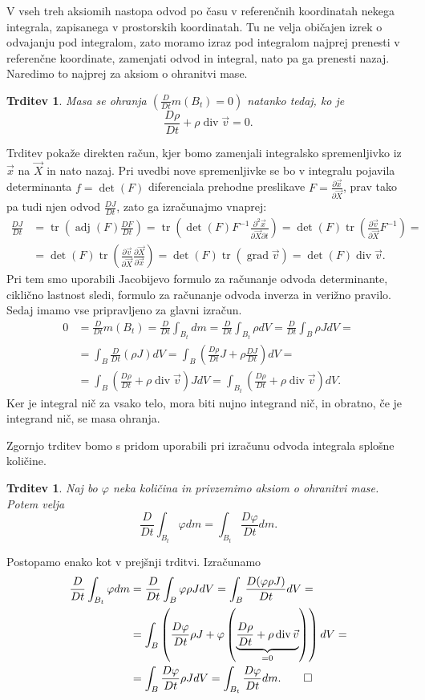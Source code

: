 \documentclass[12pt,a4paper]{article}
\theoremstyle{definition} %
\theoremstyle{plain} %
\newtheorem{trditev}[definicija]{Trditev}
\numberwithin{equation}{section}
\renewcommand{\div}{\operatorname{div}}
\newcommand{\grad}{\operatorname{grad}}
\renewcommand{\phi}{\varphi}
\newcommand{\dpar}[2]{\ensuremath{\frac{\partial #1}{\partial #2}}}
\newcommand{\DD}[2]{\ensuremath{\frac{D #1}{D #2}}}
\newcommand{\DDt}[1]{\DD{#1}{t}}
\newcommand{\vv}{\vec{v}}
\newcommand{\vX}{\vec{X}}
\newcommand{\vx}{\vec{x}}
\DeclareMathOperator{\tr}{tr}
\begin{document}
V vseh treh aksiomih nastopa odvod po času v referenčnih koordinatah nekega
integrala, zapisanega v prostorskih koordinatah. Tu ne velja običajen izrek o
odvajanju pod integralom, zato moramo izraz pod integralom najprej prenesti v
referenčne koordinate, zamenjati odvod in integral, nato pa ga prenesti nazaj.
Naredimo to najprej za aksiom o ohranitvi mase.
\begin{trditev} Masa se ohranja $(\DDt{}m(B_t) = 0)$ natanko tedaj, ko je
  \[
    \DDt\rho + \rho\div\vv = 0.
  \]
\end{trditev}
\proof
Trditev pokaže direkten račun, kjer bomo zamenjali integralsko spremenljivko iz
$\vx$ na $\vX$ in nato nazaj. Pri uvedbi nove spremenljivke se bo v integralu
pojavila determinanta $f = \det(F)$ diferenciala prehodne preslikave $F =
\dpar{\vx}{\vX}$, prav tako pa tudi njen odvod $\DDt{J}$, zato ga izračunajmo vnaprej:
\begin{align*}
  \DDt J &= \tr\left(\operatorname{adj}(F) \DDt{F}\right) =
  \tr\left(\det(F)F^{-1} \dpar{^2\vx}{\vX\partial t}\right) =
  \det(F)\tr\left(\dpar{\vv}{\vX}F^{-1}\right) = \\ &=
  \det(F)\tr\left(\dpar{\vv}{\vX}\dpar{\vX}{\vx}\right) =
  \det(F)\tr\left(\grad \vv\right) =
  \det(F)\div \vv.
\end{align*}
Pri tem smo uporabili Jacobijevo formulo za računanje odvoda
determinante, ciklično lastnost sledi, formulo za računanje odvoda inverza in verižno pravilo.
Sedaj imamo vse pripravljeno za glavni izračun.
\begin{align*}
  0 &= \DDt{}m(B_t) =
  \DDt{} \int_{B_t} dm =
  \DDt{} \int_{B_t} \rho dV =
  \DDt{} \int_{B} \rho J dV =\\ &=
  \int_{B} \DDt{}(\rho J) dV =
  \int_{B}\left( \DDt{\rho} J + \rho \DDt{J} \right)dV = \\ &=
  \int_{B}\left( \DDt{\rho}  + \rho \div\vv\right) J dV =
  \int_{B_t}\left( \DDt{\rho}  + \rho \div\vv\right) dV.
\end{align*}
Ker je integral nič za vsako telo, mora biti nujno integrand nič, in obratno, če
je integrand nič, se masa ohranja.
\endproof

Zgornjo trditev bomo s pridom uporabili pri izračunu odvoda integrala splošne
količine.
\begin{trditev}
  \label{trd:swap-der-int}
  Naj bo $\phi$ neka količina in privzemimo aksiom o ohranitvi mase. Potem
  velja
  \begin{equation}
    \DDt{} \int_{B_t}\phi dm = \int_{B_t} \DDt{\phi} dm.
    \label{eq:swap-der-int}
  \end{equation}
\end{trditev}
\proof
Postopamo enako kot v prejšnji trditvi. Izračunamo
\begin{align*}
    \DDt{} \int_{B_t}\phi dm &=
    \DDt{} \int_{B}\phi \rho J dV =
    \int_{B} \DDt{(\phi \rho J)} dV  = \\ &=
  \int_{B} \left(\DDt{\phi} \rho J + \phi \left(\underbrace{\DDt{\rho} + \rho
  \div \vv}_{=0} \right) \right)dV  = \\ &=
  \int_{B} \DDt{\phi} \rho JdV =
  \int_{B_t} \DDt{\phi} dm. \qedhere
\end{align*}
\endproof
\end{document}

